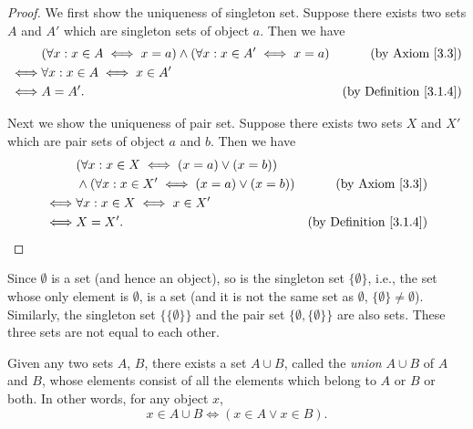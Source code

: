 \begin{proof}
    We first show the uniqueness of singleton set.
    Suppose there exists two sets \(A\) and \(A'\) which are singleton sets of object \(a\).
    Then we have
    \begin{align*}
             & (\forall x : x \in A \iff x = a) \land (\forall x : x \in A' \iff x = a) & \text{(by Axiom \ref{3.3})}        \\
        \iff & \forall x : x \in A \iff x \in A'                                                                             \\
        \iff & A = A'.                                                                  & \text{(by Definition \ref{3.1.4})}
    \end{align*}

    Next we show the uniqueness of pair set.
    Suppose there exists two sets \(X\) and \(X'\) which are pair sets of object \(a\) and \(b\).
    Then we have
    \begin{align*}
             & (\forall x : x \in X \iff (x = a) \lor (x = b))                                             \\
             & \land (\forall x : x \in X' \iff (x = a) \lor (x = b)) & \text{(by Axiom \ref{3.3})}        \\
        \iff & \forall x : x \in X \iff x \in X'                                                           \\
        \iff & X = X'.                                                & \text{(by Definition \ref{3.1.4})}
    \end{align*}
\end{proof}

\begin{example}\label{3.1.10}
    Since \(\emptyset\) is a set (and hence an object), so is the singleton set \(\{\emptyset\}\), i.e., the set whose only element is \(\emptyset\), is a set (and it is not the same set as \(\emptyset\), \(\{\emptyset\} \neq \emptyset\)).
    Similarly, the singleton set \(\{\{\emptyset\}\}\) and the pair set \(\{\emptyset, \{\emptyset\}\}\) are also sets.
    These three sets are not equal to each other.
\end{example}

\begin{axiom}\label{3.4}
    Given any two sets \(A\), \(B\), there exists a set \(A \cup B\), called the \emph{union} \(A \cup B\) of \(A\) and \(B\), whose elements consist of all the elements which belong to \(A\) or \(B\) or both.
    In other words, for any object \(x\),
    \[
        x \in A \cup B \iff (x \in A \lor x \in B).
    \]
\end{axiom}

